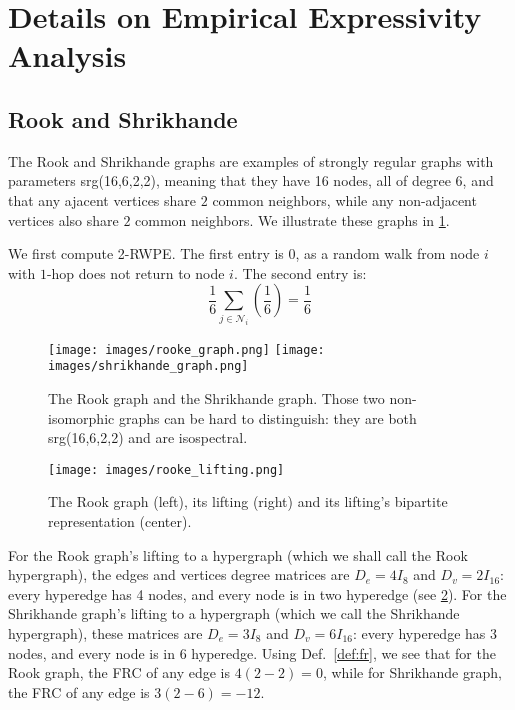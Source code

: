 \section{Details on Empirical Expressivity Analysis}\label{appendix-detailed-encodings}
\subsection{Rook and Shrikhande}\label{appendix-rook-shrikhande}

The Rook and Shrikhande graphs are examples of strongly regular graphs with parameters srg(16,6,2,2), meaning that they have 16 nodes, all of degree $6$, and that any ajacent vertices share $2$ common neighbors, while any non-adjacent vertices also share $2$ common neighbors. We illustrate these graphs in \ref{fig:side_by_side_images_rook_shri}.


We first compute 2-RWPE. The first entry is $0$, as a random walk from node $i$ with $1$-hop does not return to node $i$. The second entry is:
$$\frac{1}{6} \sum_{j \in \mathcal{N}_i} \left( \frac{1}{6} \right) = \frac{1}{6}$$

\begin{figure}[h]
  \centering
  \texttt{[image: images/rooke\_graph.png]}
  \texttt{[image: images/shrikhande\_graph.png]}
  \caption{The Rook graph and the Shrikhande graph. Those two non-isomorphic graphs can be hard to distinguish: they are both srg(16,6,2,2) and are isospectral.}
  \label{fig:side_by_side_images_rook_shri}
\end{figure}

\begin{figure}[h]
  \centering
  \texttt{[image: images/rooke\_lifting.png]}
  \caption{The Rook graph (left), its lifting (right) and its lifting's bipartite representation (center).}
  \label{fig:rook-lifting}
\end{figure}


For the Rook graph's lifting to a hypergraph (which we shall call the Rook hypergraph), the edges and vertices degree matrices are $D_e =4I_8$ and $D_v=2I_{16}$: every hyperedge has 4 nodes, and every node is in two hyperedge (see \ref{fig:rook-lifting}). For the Shrikhande graph's lifting to a hypergraph (which we call the Shrikhande hypergraph), these matrices are $D_e=3I_8$ and $D_v=6I_16$: every hyperedge has 3 nodes, and every node is in 6 hyperedge. Using Def.~\ref{def:fr}, we see that for the Rook graph, the 
FRC of any edge is $4(2-2)=0$, while for Shrikhande graph, the 
FRC of any edge is $3(2-6)=-12$.

